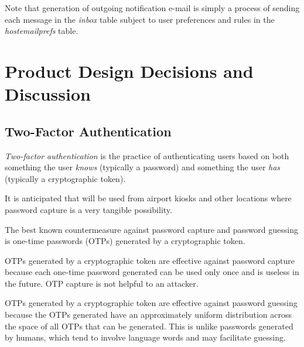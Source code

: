 Note that generation of outgoing notification e-mail is simply a process of
sending each message in the \emph{inbox} table subject to user preferences
and rules in the \emph{hostemailprefs} table. 


\section{Product Design Decisions and Discussion}
\label{ctbg0:sddc0}


\subsection{Two-Factor Authentication}
\label{ctbg0:sddc0:stfa0}

\emph{Two-factor authentication} is the practice of 
authenticating users based on both something the user \emph{knows} (typically a password)
and something the user \emph{has} (typically a cryptographic token).

It is anticipated that \emph{\productbasename{}} will be used from airport
kiosks and other locations where password capture is a very tangible possibility.

The best known countermeasure against password capture and password guessing is
one-time passwords (OTPs) generated by a
cryptographic token.  

OTPs generated by a cryptographic token are effective against password capture because
each one-time password generated can be used only once and is useless in the future.
OTP capture is not helpful to an attacker.

OTPs generated by a cryptographic token are effective against password guessing
because the OTPs generated have an approximately uniform
distribution across the space of all
OTPs that can be generated.  This is unlike passwords generated by humans,
which tend to involve language words and may facilitate guessing.


